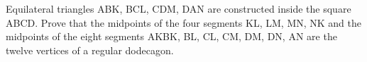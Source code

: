 \item Equilateral triangles ABK, BCL, CDM, DAN are constructed inside the square ABCD. Prove that the midpoints of the four segments KL, LM, MN, NK and the midpoints of the eight segments AKBK, BL, CL, CM, DM, DN, AN are the twelve vertices of a regular dodecagon.

